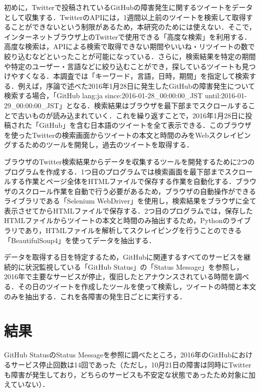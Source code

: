 \documentclass[uplatex,twocolumn]{jsarticle}
\begin{document}
初めに，Twitterで投稿されているGitHubの障害発生に関するツイートをデータとして収集する．TwitterのAPIには，1週間以上前のツイートを検索して取得することができないという制限があるため，本研究のためには使えない\cite{02}．そこで，インターネットブラウザ上のTwitterで使用できる「高度な検索」を利用する．高度な検索は，APIによる検索で取得できない期間やいいね・リツイートの数で絞り込むなどといったことが可能になっている．さらに，検索結果を特定の期間や特定のユーザー・言語などに絞り込むことができ，探しているツイートも見つけやすくなる．本調査では「キーワード，言語，日時，期間」を指定して検索する．例えば，序論で述べた2016年1月28日に発生したGitHubの障害発生について検索する場合，「GitHub lang:ja since:2016-01-28\_00:00:00\_JST until:2016-01-29\_00:00:00\_JST」となる．検索結果はブラウザを最下部までスクロールすることで古いものが読み込まれていく．これを繰り返すことで，2016年1月28日に投稿された「GitHub」を含む日本語のツイートを全て表示できる．このブラウザを使ったTwitterの検索画面からツイートの本文と時間のみをWebスクレイピングするためのツールを開発し，過去のツイートを取得する．

ブラウザのTwitter検索結果からデータを収集するツールを開発するために2つのプログラムを作成する．1つ目のプログラムでは検索画面を最下部までスクロールする作業とページ全体をHTMLファイルで保存する作業を自動化する．ブラウザのスクロール作業を自動で行う必要があるため，ブラウザの自動操作ができるライブラリである「Selenium WebDriver」を使用し，検索結果をブラウザに全て表示させてからHTMLファイルで保存する．2つ目のプログラムでは，保存したHTMLファイルからツイートの本文と時間のみ抽出するため，Pythonのライブラリであり，HTMLファイルを解析してスクレイピングを行うことのできる「BeautifulSoup4」を使ってデータを抽出する．

データを取得する日を特定するため，GitHubに関連するすべてのサービスを継続的に状況監視している「GitHub Status」の「Status Message」を参照し，2016年で主要なサービスが停止，復旧したとアナウンスされている時間を調べる．その日のツイートを作成したツールを使って検索し，ツイートの時間と本文のみを抽出する．これを各障害の発生日ごとに実行する．

\section{結果}
GitHub StatusのStatus Messageを参照に調べたところ，2016年のGitHubにおけるサービス停止回数は14回であった（ただし，10月21日の障害は同時にTwitterも障害が発生しており，どちらのサービスも不安定な状態であったため対象に加えていない）．
\end{document}

